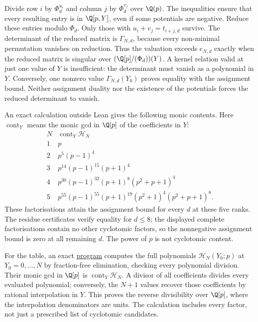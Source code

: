 Divide row $i$ by $\Phi_d^{u_i}$ and column $j$ by $\Phi_d^{v_j}$
over $\Q(p)$. The inequalities ensure that every resulting entry is
in $\Q[p,Y]$, even if some potentials are negative. Reduce these
entries modulo $\Phi_d$. Only those with
$u_i+v_j=t_{i+j,d}$ survive. The determinant of the reduced matrix is
$\Gamma_{N,d}$, because every non-minimal permutation vanishes on
reduction. Thus the valuation exceeds $e_{N,d}$ exactly when the
reduced matrix is singular over $(\Q[p]/(\Phi_d))(Y)$.
A kernel relation valid at just one value of $Y$ is insufficient:
the determinant must vanish as a polynomial in $Y$. Conversely, one
nonzero value $\Gamma_{N,d}(Y_0)$ proves equality with the assignment
bound. Neither assignment duality nor the existence of the potentials
forces the reduced determinant to vanish.


An exact calculation outside Lean gives the following monic contents.
Here $\operatorname{cont}_Y$ means the monic gcd in $\Q[p]$ of the
coefficients in $Y$:
\[
\begin{array}{c|l}
N&\operatorname{cont}_Y\mathcal H_N\\\hline
1&p\\
2&p^5(p-1)^4\\
3&p^{14}(p-1)^{15}(p+1)^4\\
4&p^{30}(p-1)^{32}(p+1)^8(p^2+p+1)^4\\
5&p^{55}(p-1)^{55}(p+1)^{19}(p^2+1)^4(p^2+p+1)^8.
\end{array}
\]
These factorisations attain the assignment bound for every $d$ at
these five ranks. The residue certificates verify equality for
$d\le8$; the displayed complete factorisations contain no other
cyclotomic factors, so the nonnegative assignment bound is zero at
all remaining $d$. The power of $p$ is not cyclotomic content.

For the table, an exact
\href{https://github.com/wcook04/plectis-erdos/blob/4beca4ad0c00a626def9c73f2420e20ebf8d1968/research/experiments/erdos1049/cyclotomic_content.py}{program}
computes the full polynomials
$\mathcal H_N(Y_0;p)$ at $Y_0=0,\ldots,N$ by fraction-free
elimination, checking every polynomial division. Their monic gcd in $\Q[p]$ is $\operatorname{cont}_Y\mathcal H_N$.
A divisor of all coefficients divides every evaluated polynomial;
conversely, the $N+1$ values recover those coefficients by rational
interpolation in $Y$. This proves the reverse divisibility over
$\Q[p]$, where the interpolation denominators are units. The calculation includes every
factor, not just a prescribed list of cyclotomic candidates.

